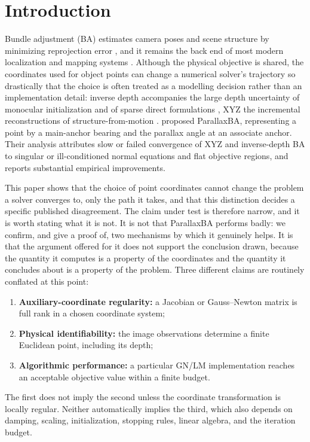 \documentclass[11pt,a4paper]{article}
\let\cite\citep
\theoremstyle{definition}
\theoremstyle{remark}
\begin{document}
\section{Introduction}
Bundle adjustment (BA) estimates camera poses and scene structure by minimizing reprojection error \cite{triggs1999bundle,hartley2004multiple}, and it remains the back end of most modern localization and mapping systems \cite{cadena2016slam}. Although the physical objective is shared, the coordinates used for object points can change a numerical solver's trajectory so drastically that the choice is often treated as a modelling decision rather than an implementation detail: inverse depth accompanies the large depth uncertainty of monocular initialization \cite{civera2008inverse} and of sparse direct formulations \cite{engel2018dso}, XYZ the incremental reconstructions of structure-from-motion \cite{snavely2006photo,schonberger2016sfm}. \citet{zhao2015parallaxba} proposed ParallaxBA, representing a point by a main-anchor bearing and the parallax angle at an associate anchor. Their analysis attributes slow or failed convergence of XYZ and inverse-depth BA to singular or ill-conditioned normal equations and flat objective regions, and reports substantial empirical improvements.

This paper shows that the choice of point coordinates cannot change the problem a solver converges to, only the path it takes, and that this distinction decides a specific published disagreement. The claim under test is therefore narrow, and it is worth stating what it is not. It is not that ParallaxBA performs badly: we confirm, and give a proof of, two mechanisms by which it genuinely helps. It is that the argument offered for it does not support the conclusion drawn, because the quantity it computes is a property of the coordinates and the quantity it concludes about is a property of the problem. Three different claims are routinely conflated at this point:
\begin{enumerate}[leftmargin=2em]
  \item \textbf{Auxiliary-coordinate regularity:} a Jacobian or Gauss--Newton matrix is full rank in a chosen coordinate system;
  \item \textbf{Physical identifiability:} the image observations determine a finite Euclidean point, including its depth;
  \item \textbf{Algorithmic performance:} a particular GN/LM implementation reaches an acceptable objective value within a finite budget.
\end{enumerate}
The first does not imply the second unless the coordinate transformation is locally regular. Neither automatically implies the third, which also depends on damping, scaling, initialization, stopping rules, linear algebra, and the iteration budget.
\end{document}
